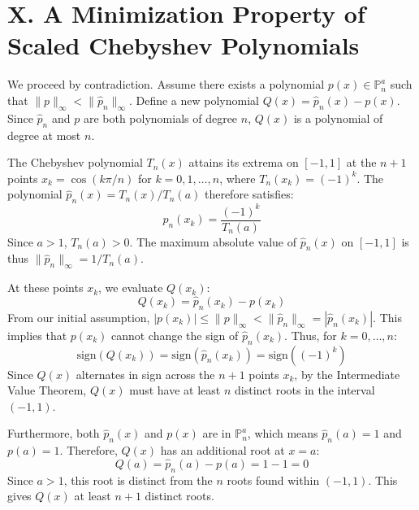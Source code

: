 \documentclass[a4paper]{article}
\begin{document}
\section*{X. A Minimization Property of Scaled Chebyshev Polynomials}

We proceed by contradiction. Assume there exists a polynomial $p(x) \in \mathbb{P}_n^a$ such that $\|p\|_{\infty} < \|\hat{p}_n\|_{\infty}$.
Define a new polynomial $Q(x) = \hat{p}_n(x) - p(x)$. Since $\hat{p}_n$ and $p$ are both polynomials of degree $n$, $Q(x)$ is a polynomial of degree at most $n$.

The Chebyshev polynomial $T_n(x)$ attains its extrema on $[-1,1]$ at the $n+1$ points $x_k = \cos(k\pi/n)$ for $k=0,1,\dots,n$, where $T_n(x_k) = (-1)^k$.
The polynomial $\hat{p}_n(x) = T_n(x)/T_n(a)$ therefore satisfies:
\[
\hat{p}_n(x_k) = \frac{(-1)^k}{T_n(a)}
\]
Since $a > 1$, $T_n(a) > 0$. The maximum absolute value of $\hat{p}_n(x)$ on $[-1,1]$ is thus $\|\hat{p}_n\|_{\infty} = 1/T_n(a)$.

At these points $x_k$, we evaluate $Q(x_k)$:
\[
Q(x_k) = \hat{p}_n(x_k) - p(x_k)
\]
From our initial assumption, $|p(x_k)| \le \|p\|_{\infty} < \|\hat{p}_n\|_{\infty} = |\hat{p}_n(x_k)|$.
This implies that $p(x_k)$ cannot change the sign of $\hat{p}_n(x_k)$. Thus, for $k=0, \dots, n$:
\[
\mathrm{sign}(Q(x_k)) = \mathrm{sign}(\hat{p}_n(x_k)) = \mathrm{sign}((-1)^k)
\]
Since $Q(x)$ alternates in sign across the $n+1$ points $x_k$, by the Intermediate Value Theorem, $Q(x)$ must have at least $n$ distinct roots in the interval $(-1,1)$.

Furthermore, both $\hat{p}_n(x)$ and $p(x)$ are in $\mathbb{P}_n^a$, which means $\hat{p}_n(a) = 1$ and $p(a)=1$.
Therefore, $Q(x)$ has an additional root at $x=a$:
\[
Q(a) = \hat{p}_n(a) - p(a) = 1 - 1 = 0
\]
Since $a > 1$, this root is distinct from the $n$ roots found within $(-1,1)$. This gives $Q(x)$ at least $n+1$ distinct roots.
\end{document}

